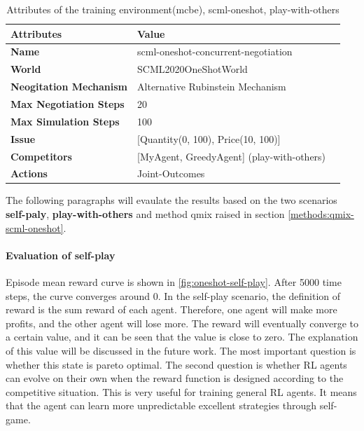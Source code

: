 \begin{table}[htbp]
\centering
\begin{tabular}{l l l} \toprule
\bfseries \textbf{Attributes}    & \bfseries \textbf{Value}                                             \\ \midrule
\textbf{Name}                    & scml-oneshot-concurrent-negotiation                                  \\
\textbf{World}                   & SCML2020OneShotWorld                                                 \\
\textbf{Neogitation Mechanism}   & Alternative Rubinstein Mechanism                                                         \\
\textbf{Max Negotiation Steps}   & 20                                                                  \\
\textbf{Max Simulation Steps}    & 100                                                                   \\
\textbf{Issue}             	     & [Quantity(0, 100), Price(10, 100)]                     \\
\textbf{Competitors}             & [MyAgent, GreedyAgent] (play-with-others)                                       \\
\textbf{Actions}                 & Joint-Outcomes                                                             \\
\bottomrule
\end{tabular}
\caption{Attributes of the training environment(mcbe), scml-oneshot, play-with-others}
\label{tab:attributes-mcbe-concurrent-negotiation-scml-oneshot-with-others}
\end{table}

The following paragraphs will evaulate the results based on the two scenarios \textbf{self-paly},\textbf{ play-with-others} and method qmix raised in section \ref{methods:qmix-scml-oneshot}.

\paragraph{Evaluation of self-play} 
Episode mean reward curve is shown in \ref{fig:oneshot-self-play}. After 5000 time steps, the curve converges around 0. In the self-play scenario, the definition of reward is the sum reward of each agent. Therefore, one agent will make more profits, and the other agent will lose more. The reward will eventually converge to a certain value, and it can be seen that the value is close to zero. The explanation of this value will be discussed in the future work. The most important question is whether this state is pareto optimal. The second question is whether RL agents can evolve on their own when the reward function is designed according to the competitive situation. This is very useful for training general RL agents. It means that the agent can learn more unpredictable excellent strategies through self-game.

